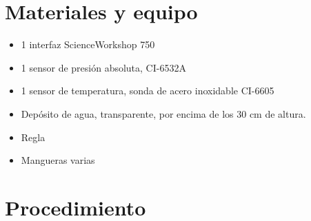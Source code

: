\documentclass[12pt,letterpaper]{report}
\newcommand{\mat}{Materiales y equipo}
\newcommand{\pro}{Procedimiento}
\begin{document}
\section{\mat}
\begin{itemize}
\item 1 interfaz ScienceWorkshop\,\textregistered\,750
\item 1 sensor de presión absoluta, CI-6532A
\item 1 sensor de temperatura, sonda de acero inoxidable CI-6605
\item Depósito de agua, transparente, por encima de los 30 cm de altura.
\item Regla
\item Mangueras varias
\end{itemize}


\section{\pro}
\end{document}
